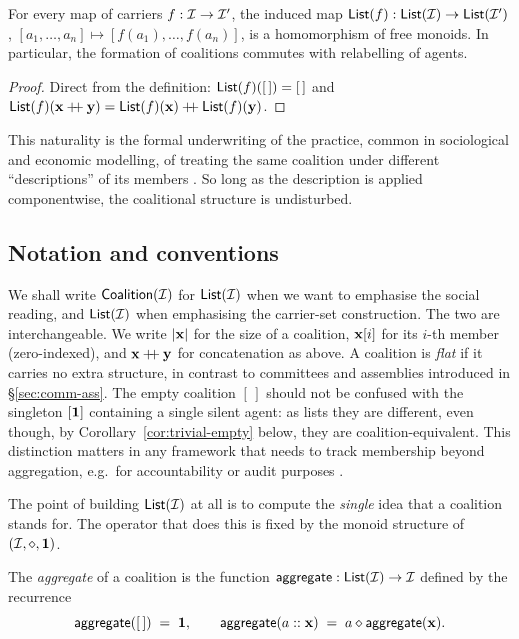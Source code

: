 \begin{proposition}\label{prop:nat}
For every map of carriers $f : \mathcal{I} \to \mathcal{I}'$, the induced map
$\mathsf{List}(f) : \mathsf{List}(\mathcal{I}) \to \mathsf{List}(\mathcal{I}')$, $[a_1,\ldots,a_n]
\mapsto [f(a_1),\ldots,f(a_n)]$, is a homomorphism of free monoids.
In particular, the formation of coalitions commutes with relabelling
of agents.
\end{proposition}

\begin{proof}
Direct from the definition: $\mathsf{List}(f)([\,]) = [\,]$ and
$\mathsf{List}(f)(\mathbf{x} \mathbin{+\!\!+} \mathbf{y}) = \mathsf{List}(f)(\mathbf{x}) \mathbin{+\!\!+} \mathsf{List}(f)(\mathbf{y})$.
\end{proof}

This naturality is the formal underwriting of the practice, common in
sociological and economic modelling, of treating the same coalition
under different ``descriptions'' of its members
\cite{ListPettit2011, Hardin1982}. So long as the description is
applied componentwise, the coalitional structure is undisturbed.

\subsection*{Notation and conventions}

We shall write $\mathsf{Coalition}(\mathcal{I})$ for $\mathsf{List}(\mathcal{I})$ when we want
to emphasise the social reading, and $\mathsf{List}(\mathcal{I})$ when emphasising
the carrier-set construction. The two are interchangeable. We write
$|\mathbf{x}|$ for the size of a coalition, $\mathbf{x}[i]$ for its $i$-th member
(zero-indexed), and $\mathbf{x} \mathbin{+\!\!+} \mathbf{y}$ for concatenation as above.
A coalition is \emph{flat} if it carries no extra structure, in
contrast to committees and assemblies introduced in
\S\ref{sec:comm-ass}. The empty coalition $[\,]$ should not be
confused with the singleton $[\mathbf{1}]$ containing a single silent
agent: as lists they are different, even though, by
Corollary~\ref{cor:trivial-empty} below, they are coalition-equivalent.
This distinction matters in any framework that needs to track
membership beyond aggregation, e.g.~for accountability or audit
purposes \cite{ListPettit2011}.


\label{sec:aggregate}

The point of building $\mathsf{List}(\mathcal{I})$ at all is to compute the
\emph{single} idea that a coalition stands for. The operator that
does this is fixed by the monoid structure of $(\mathcal{I},\mathbin{\diamond},\mathbf{1})$.

\begin{definition}[Aggregate]\label{def:aggregate}
The \emph{aggregate} of a coalition is the function
$\mathsf{aggregate} : \mathsf{List}(\mathcal{I}) \to \mathcal{I}$ defined by the recurrence
\[
  \mathsf{aggregate}([\,]) \;=\; \mathbf{1},
  \qquad
  \mathsf{aggregate}(a :: \mathbf{x}) \;=\; a \mathbin{\diamond} \mathsf{aggregate}(\mathbf{x}).
\]
\end{definition}

